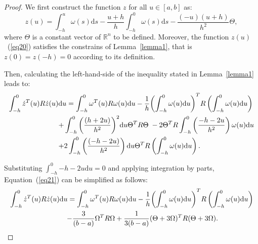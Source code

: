 \documentclass[a4paper]{cas-sc}
\newtheorem*{proof}{Proof}
\begin{document}
\begin{proof}
  We first construct the function $z$ for all $ u \in [a,b] $ as:
  \begin{equation}
    z(u) = \int_{ - h}^u {\omega (s){\text{d}}s}  - \frac{{u + h}}{h}\int_{ - h}^0 {\omega (s){\text{d}}s}  - \frac{{( - u)(u + h)}}{{{h^2}}}\Theta,
    \label{eq20}
  \end{equation}
  where $ \Theta  $ is a constant vector of $ {\mathbb{R}^n} $ to be defined. Moreover, the function $z\left(u\right)$~(\ref{eq20}) satisfies the constrains of Lemma~\ref{lemma1}, that is $ z(0) = z( - h) = 0 $ according to its definition.

  Then, calculating the left-hand-side of the inequality stated in Lemma~\ref{lemma1} leads to:
  \begin{equation}
    \begin{gathered}
      \int_{ - h}^0 {{{\dot z}^T}(u)R\dot z(u){\text{d}}u}  = \int_{ - h}^0 {{\omega ^T}(u)R\omega (u){\text{d}}u}  - \frac{1}{h}{\left( {\int_{ - h}^0 {\omega (u){\text{d}}u} } \right)^T}R\left( {\int_{ - h}^0 {\omega (u){\text{d}}u} } \right) \hfill \\
      \quad \quad \quad \quad \quad \quad \quad  + \int_{ - h}^0 {{{\left( {\frac{{(h + 2u)}}{{{h^2}}}} \right)}^2}{\text{d}}u{\Theta ^T}R\Theta } \; - 2{\Theta ^T}R\int_{ - h}^0 {\left( {\frac{{ - h - 2u}}{{{h^2}}}} \right)\omega (u){\text{d}}u}  \hfill \\
      \quad \quad \quad \quad \quad \quad \quad  + 2\int_{ - h}^0 {\left( {\frac{{( - h - 2u)}}{{{h^2}}}} \right){\text{d}}u} {\Theta ^T}R\left( {\int_{ - h}^0 {\omega (u){\text{d}}u} } \right). \hfill \\
    \end{gathered}
    \label{eq21}
  \end{equation}

  Substituting $ \int_{ - h}^0 { - h - 2u{\text{d}}u}  = 0 $ and applying integration by parts, Equation~(\ref{eq21}) can be simplified as follows:
  \begin{equation}
    \begin{gathered}
      \int_{ - h}^0 {{{\dot z}^T}(u)R\dot z(u){\text{d}}u}  = \int_{ - h}^0 {{\omega ^T}(u)R\omega (u){\text{d}}u}  - \frac{1}{h}{\left( {\int_{ - h}^0 {\omega (u){\text{d}}u} } \right)^T}R\left( {\int_{ - h}^0 {\omega (u){\text{d}}u} } \right) \hfill \\
      \quad \quad \quad \quad \quad \quad \quad \quad  - \frac{3}{{(b - a)}}{\Omega ^T}R\Omega  + \frac{1}{{3(b - a)}}{(\Theta  + 3\Omega )^T}R(\Theta  + 3\Omega ). \hfill \\
    \end{gathered}
    \label{eq22}
  \end{equation}


\end{proof}
\end{document}
